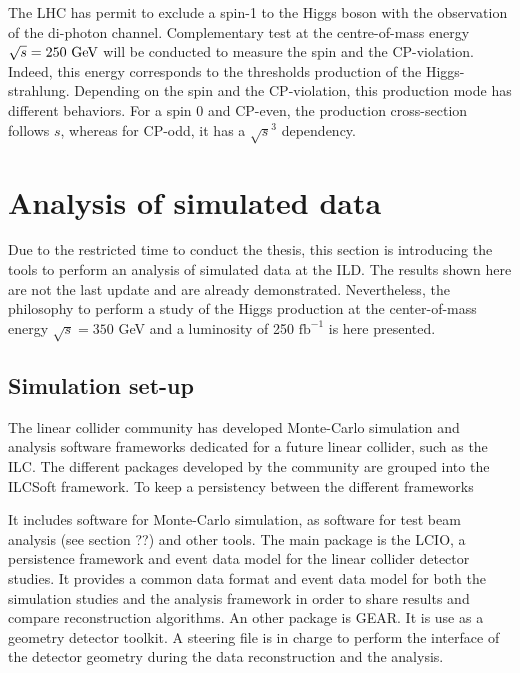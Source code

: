     The \gls{LHC} has permit to exclude a spin-1 to the Higgs boson with the observation of the di-photon channel.
    Complementary test at the centre-of-mass energy $\sqrt{s} = 250~\rm{GeV}$ will be conducted to measure the spin and the CP-violation.
    Indeed, this energy corresponds to the thresholds production of the Higgs-strahlung. 
    Depending on the spin and the CP-violation, this production mode has different behaviors.
    For a spin 0 and CP-even, the production cross-section follows $s$, whereas for CP-odd, it has a $\sqrt{s}^3$ dependency.

  \section{Analysis of simulated data}
  
    Due to the restricted time to conduct the thesis, this section is introducing the tools to perform an analysis of simulated data at the ILD. 
    The results shown here are not the last update and are already demonstrated. 
    Nevertheless, the philosophy to perform a study of the Higgs production at the center-of-mass energy $\sqrt{s} = 350$ GeV and a luminosity of 250 $\text{fb}^{-1}$ is here presented.
  
  \subsection{Simulation set-up}  
  \label{subsec:ILCSOFT}
  
    The linear collider community has developed Monte-Carlo simulation and analysis software frameworks dedicated for a future linear collider, such as the \gls{ILC}. 
    The different packages developed by the community are grouped into the ILCSoft framework\cite{ilcsoft}.
    To keep a persistency between the different frameworks
    
    It includes software for Monte-Carlo simulation, as software for test beam analysis (see section ??) and other tools.
    The main package is the \gls{LCIO}, a persistence framework and event data model for the linear collider detector studies\cite{lcio}. 
    It provides a common data format and event data model for both the simulation studies and the analysis framework in order to share results and compare reconstruction algorithms.
    An other package is \gls{GEAR}.
    It is use as a geometry detector toolkit.
    A steering file is in charge to perform the interface of the detector geometry during the data reconstruction and the analysis.

